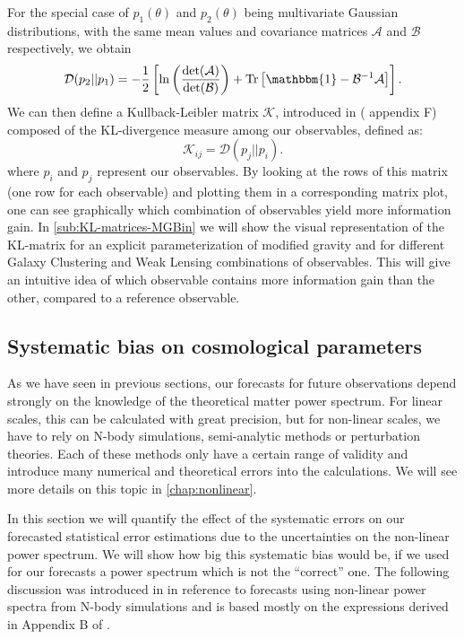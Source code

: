 For the special case of $p_1(\theta)$ and $p_2(\theta)$ being multivariate Gaussian distributions,
with the same mean values and covariance matrices $\mathcal{A}$ and $\mathcal{B}$ respectively, we obtain
\begin{equation}\label{eq:KL-Gaussian}
\mathcal{D}(p_2||p_1) = -\frac{1}{2} \left[\ln\left(\frac{\det(\mathcal{A})}{\det(\mathcal{B})} \right) +\mathrm{Tr}\left[\mathbbm{1}-\mathcal{B}^{-1}\mathcal{A}   \right] \right].
\end{equation}
We can then define a Kullback-Leibler matrix $\mathcal{K}$, introduced in (\cite{casas_mg_forec} appendix F) composed of the KL-divergence measure among our observables, defined as:
\begin{equation}\label{eq:KL-Matrix}
\mathcal{K}_{ij}=\mathcal{D}(p_j||p_i).
\end{equation}
where $p_i$ and $p_j$ represent our observables.
By looking at the rows of this matrix (one row for each observable) and plotting them
in a corresponding matrix plot, one can see graphically which combination
of observables yield more information gain.
In \cref{sub:KL-matrices-MGBin} we will show the visual representation
of the KL-matrix for an explicit parameterization of modified gravity
and for different Galaxy Clustering and Weak Lensing combinations of observables.
This will give an intuitive idea of which observable contains more information gain than the other, 
compared to a reference observable.

\subsection{Systematic bias on cosmological parameters \label{sub:syst-bias-theory}}

As we have seen in previous sections, our forecasts for future observations
depend strongly on the knowledge of the theoretical matter power spectrum.
For linear scales, this can be calculated with great precision, but for non-linear scales, 
we have to rely on N-body simulations, semi-analytic methods or perturbation theories. Each 
of these methods only have a certain range of validity and introduce many numerical and theoretical 
errors into the calculations. We will see more details on this topic in \cref{chap:nonlinear}.

In this section we will quantify the effect of the systematic errors on our forecasted statistical error estimations
due to the uncertainties on the non-linear power spectrum. We will
show how big this systematic bias would be, if we used for our forecasts
a power spectrum which is not the ``correct'' one. 
The following discussion was introduced in \cite{casas_fitting_2015} in reference to
forecasts using non-linear power spectra from N-body simulations and is based mostly on 
the expressions derived in Appendix
B of \cite{taylor_probing_2007}.


